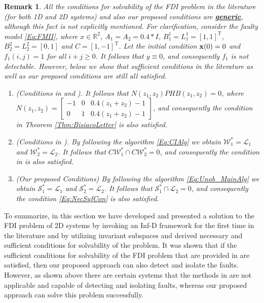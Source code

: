 \documentclass[journal,12pt,draftcls,onecolumn]{IEEEtran}
\newcommand{\tran}{\mathrm{T}}
\newcommand{\bbm}{\begin{bmatrix}}
\newcommand{\ebm}{\end{bmatrix}}
\newcommand{\ssp}[1]{\mathscr{#1}}      \newcommand{\setssp}[1]{\mathfrak{#1}}   \newcommand{\fld}[1]{\mathbb{#1}}       \newcommand{\op}[1]{\mathcal{#1}}       \newcommand{\sumbanach}[1]{\sum{#1}}
\newtheorem{remark}{Remark}
\begin{document}
\begin{remark}\label{Rem:Generic}
	All the conditions for solvability of the FDI problem in the literature (for both 1D and 2D systems) and also our proposed conditions are \underline{{\bf generic}}, although this fact is not explicitly mentioned. For clarification, consider the faulty model \eqref{Eq:FMII}, where $x\in\fld{R}^2$, $A_1=A_2=0.4*I$, $B_1^1=L_1^1=[1,1]^\tran$, $B_2^2=L_2^2=[0,1]$ and $C = [1,-1]^\tran$. Let the initial condition ${\bf x}(0)=0$ and $f_1(i,j)=1$ for all $i+j\geq0$. It follows that $y\equiv0$, and consequently $f_1$ is not detectable. However, below we show that  sufficient conditions in the literature \cite{BisiaccoLetter,BisiaccoMultiDim,Malek_3DFDI}  as well as our proposed conditions are still all satisfied.
	\begin{enumerate}
		\item (Conditions in \cite{BisiaccoLetter} and \cite{BisiaccoMultiDim}). It follows that  $N(z_1,z_2)PHB(z_1,z_2)=0$, where $N(z_1,z_2)=\bbm -1 &0 &0.4(z_1+z_2)-1\\ 0 &1 &0.4(z_1+z_2)-1\ebm$, and consequently the condition in Theorem \ref{Thm:BisiacoLetter} is also satisfied.
		\item (Conditions in \cite{Malek_3DFDI}). By following the algorithm \eqref{Eq:CIAlg} we obtain $\ssp{W}_1^*=\ssp{L}_1$ and $\ssp{W}_2^*=\ssp{L}_2$. It follows that $C\ssp{W}_1^*\cap C\ssp{W}_2^*=0$, and consequently the condition in \cite{Malek_3DFDI} is also satisfied.
		\item (Our proposed Conditions)  By following the algorithm \eqref{Eq:Unob_MainAlg} we obtain $\op{S}_1^*=\ssp{L}_1$ and $\op{S}_2^*=\ssp{L}_2$. It follows that $\op{S}_1^*\cap \ssp{L}_2=0$, and consequently the condition \eqref{Eq:NecSufCon} is also satisfied.
	\end{enumerate}
\end{remark}
To summarize, in this section we have developed and presented a solution to the FDI problem of 2D systems by invoking an Inf-D framework for the first time in the literature and by utilizing invariant subspaces and derived necessary and sufficient conditions for solvability of the problem. It was shown that if the sufficient conditions for solvability of the FDI problem that are provided in \cite{Malek_3DFDI,Malek_3DFDIConf} are satisfied, then our proposed approach can also detect and isolate the faults. However, as shown above  there are certain systems that the methods in \cite{Malek_3DFDI,BisiaccoMultiDim,BisiaccoLetter}  are not applicable and capable of detecting and isolating faults, whereas our proposed approach can solve this problem successfully.
\end{document}
